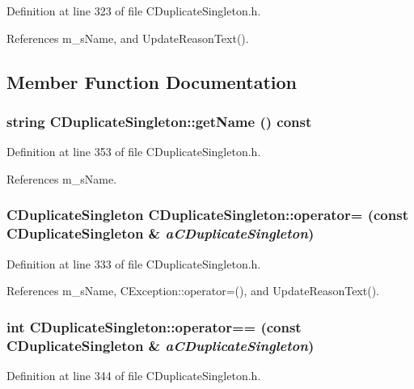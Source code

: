 Definition at line 323 of file CDuplicate\-Singleton.h.

References m\_\-s\-Name, and Update\-Reason\-Text().

\subsection{Member Function Documentation}
\subsubsection{\setlength{\rightskip}{0pt plus 5cm}string CDuplicate\-Singleton::get\-Name () const\hspace{0.3cm}{\tt  [inline]}}\label{classCDuplicateSingleton_a8}




Definition at line 353 of file CDuplicate\-Singleton.h.

References m\_\-s\-Name.
\subsubsection{\setlength{\rightskip}{0pt plus 5cm}CDuplicate\-Singleton CDuplicate\-Singleton::operator= (const CDuplicate\-Singleton \& {\em a\-CDuplicate\-Singleton})\hspace{0.3cm}{\tt  [inline]}}\label{classCDuplicateSingleton_a6}




Definition at line 333 of file CDuplicate\-Singleton.h.

References m\_\-s\-Name, CException::operator=(), and Update\-Reason\-Text().
\subsubsection{\setlength{\rightskip}{0pt plus 5cm}int CDuplicate\-Singleton::operator== (const CDuplicate\-Singleton \& {\em a\-CDuplicate\-Singleton})\hspace{0.3cm}{\tt  [inline]}}\label{classCDuplicateSingleton_a7}




Definition at line 344 of file CDuplicate\-Singleton.h.


